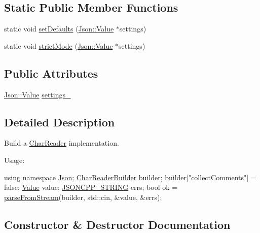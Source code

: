 \subsection*{Static Public Member Functions}
\begin{DoxyCompactItemize}
\item 
static void \hyperlink{classJson_1_1CharReaderBuilder_a03ff031e06aabff989ab4addc87294ab_a03ff031e06aabff989ab4addc87294ab}{set\+Defaults} (\hyperlink{classJson_1_1Value}{Json\+::\+Value} $\ast$settings)
\item 
static void \hyperlink{classJson_1_1CharReaderBuilder_a9c19e3c5475f9072d527810d4bf56749_a9c19e3c5475f9072d527810d4bf56749}{strict\+Mode} (\hyperlink{classJson_1_1Value}{Json\+::\+Value} $\ast$settings)
\end{DoxyCompactItemize}
\subsection*{Public Attributes}
\begin{DoxyCompactItemize}
\item 
\hyperlink{classJson_1_1Value}{Json\+::\+Value} \hyperlink{classJson_1_1CharReaderBuilder_ac69b7911ad64c171c51ebaf2ea26d958_ac69b7911ad64c171c51ebaf2ea26d958}{settings\+\_\+}
\end{DoxyCompactItemize}


\subsection{Detailed Description}
Build a \hyperlink{classJson_1_1CharReader}{Char\+Reader} implementation. 

Usage\+: 
\begin{DoxyCode}
\textcolor{keyword}{using namespace }\hyperlink{namespaceJson}{Json};
\hyperlink{classJson_1_1CharReaderBuilder}{CharReaderBuilder} builder;
builder[\textcolor{stringliteral}{"collectComments"}] = \textcolor{keyword}{false};
\hyperlink{classJson_1_1Value}{Value} value;
\hyperlink{json-forwards_8h_a1e723f95759de062585bc4a8fd3fa4be_a1e723f95759de062585bc4a8fd3fa4be}{JSONCPP\_STRING} errs;
\textcolor{keywordtype}{bool} ok = \hyperlink{namespaceJson_aab0cf1ecf81d1aeca12be2a416a84352_aab0cf1ecf81d1aeca12be2a416a84352}{parseFromStream}(builder, std::cin, &value, &errs);
\end{DoxyCode}
 

\subsection{Constructor \& Destructor Documentation}
\mbox{\label{classJson_1_1CharReaderBuilder_a6e197b69a2ede3d87b03b9c5c78ba46a_a6e197b69a2ede3d87b03b9c5c78ba46a}} 

